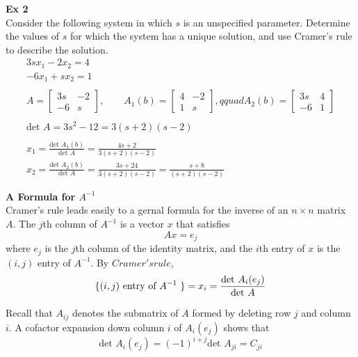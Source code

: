 \documentclass{article}
\begin{document}
   \textbf{Ex 2}\\
   Consider the following system in which $ s $ is an unspecified parameter. Determine the values of $ s $ for which the system has a unique solution, and use Cramer's rule to describe the solution.
   \[
     \begin{gathered}
     3sx_1-2x_2=4\\
     -6x_1+sx_2=1\\
     ~\\
     A= \begin{bmatrix}
       3s &-2\\
       -6 &s
     \end{bmatrix}, \qquad A_1(b)=
     \begin{bmatrix}
       4 &-2\\
       1 &s
     \end{bmatrix}, qquad A_2(b)=
     \begin{bmatrix}
       3s &4\\
       -6 &1
     \end{bmatrix}\\
     ~\\
     \text{det }A=3s^{2}-12=3(s+2)(s-2)\\
     ~\\
     x_1=\frac{\text{det }A_1(b)}{\text{det }A}=\frac{4s+2}{3(s+2)(s-2)}\\
     x_2=\frac{\text{det }A_2(b)}{\text{det }A}=\frac{3s+24}{3(s+2)(s-2)}=\frac{s+8}{(s+2)(s-2)}
     \end{gathered}
   \]
   
   \textbf{A Formula for $ A^{-1} $ }\\
   Cramer's rule leads easily to a gernal formula for the inverse of an $ n \times n $ matrix $ A $. The $ j $th column of $ A^{-1} $ is a vector $ x $ that satisfies
   \[
     Ax=e_j
   \]
   where $ e_j $ is the $ j $th column of the identity matrix, and the $ i $th entry of $ x $ is the $ (i,j) $ entry of $ A^{-1} $. By $ Cramer's rule $,
   \[
     \begin{gathered}
     \{ (i,j)\text{ entry of $ A^{-1} $ } \} = x_i=\frac{\text{det }A_i(e_j)}{\text{det }A}
     \end{gathered}
   \]

  Recall that $ A_{ij} $ denotes the submatrix of $ A $ formed by deleting row $ j $ and column $ i $. A cofactor expansion down column $ i $ of $ A_i(e_j) $ shows that
  \[
    \text{det }A_i(e_j)=(-1)^{i+j}\text{det }A_{ji}=C_{ji}
  \]
\end{document}
